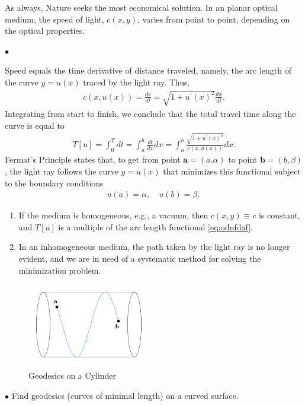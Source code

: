 \documentclass{article}
\begin{document}
As always, Nature seeks the most economical  solution. In an  planar optical medium, the speed of light, $c(x, y)$, varies from point to point, depending on the optical properties. 

$\bullet$  

Speed equals the time derivative of distance traveled, namely, the arc length of the curve $y=u(x)$ traced by the light ray. Thus,
\begin{align*}
c(x, u(x))=\frac{d s}{d t}=\sqrt{1+u^{\prime}(x)^{2}} \frac{d x}{d t} .
\end{align*}
Integrating from start to finish, we conclude that the total travel time along the curve is equal to
\begin{align*}
T[u]=\int_{0}^{T} d t=\int_{a}^{b} \frac{d t}{d x} d x=\int_{a}^{b} \frac{\sqrt{1+u^{\prime}(x)^{2}}}{c(x, u(x))} d x .
\end{align*}
Fermat's Principle states that, to get from point $\mathbf{a}=(a . \alpha)$ to point $\mathbf{b}=(b, \beta)$, the light ray follows the curve $y=u(x)$ that minimizes this functional subject to the boundary conditions
\begin{align*}
u(a)=\alpha, \quad u(b)=\beta,
\end{align*}
\begin{enumerate}
    \item If the medium is homogeneous, e.g., a vacuum,  then $c(x, y) \equiv c$ is constant, and $T[u]$ is a multiple of the arc length functional \cref{eq:odnfdaf}.
    \item In an inhomogeneous medium, the path taken by the light ray is no longer evident, and we are in need of a systematic method for solving the minimization problem.
\end{enumerate}
\begin{figure}[ht]
    \centering
    \includegraphics[width=0.5\textwidth]{Figs/a2.png}
    \caption{Geodesics on a Cylinder}
    \label{fig:shortest path2}
\end{figure}
$\bullet$  Find geodesics (curves of minimal length) on a curved surface.
\end{document}
